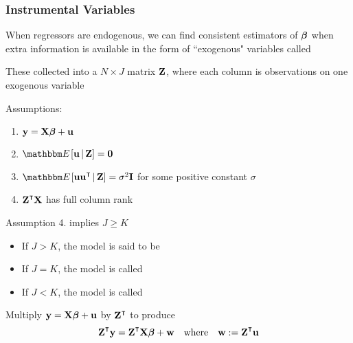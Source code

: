\begin{frame}\frametitle{Instrumental Variables}

    \vspace{2em}
    When regressors are endogenous, we can find consistent estimators of ${\boldsymbol \beta}$ when extra information is
    available in the form of ``exogenous" variables called 
    
    These collected into a $N \times J$ matrix $\mathbf Z$, where
    each column is observations on one exogenous variable 
    
    \vspace{.7em}
    Assumptions:
    \begin{enumerate}
        \item ${\mathbf y} = \mathbf X {\boldsymbol \beta} + {\mathbf u}$
        \item $\EE[ \boldu \given \boldZ] = \boldzero$
        \item $\EE[ \boldu \boldu^\T \given \boldZ] = \sigma^2 \boldI$ for some
            positive constant $\sigma$
        \item $\boldZ^\T \boldX$ has full column rank
    \end{enumerate}


\end{frame}

\begin{frame}
    
    \vspace{2em}
    Assumption 4. implies $J \geq K$
    \begin{itemize}
        \item If $J > K$, the model is said to be 
        \item If $J=K$, the model
    is called 
        \item If $J < K$, the model is called
    \end{itemize}
    
    \vspace{.7em}
    Multiply ${\mathbf y} = \mathbf X {\boldsymbol \beta} + {\mathbf u}$ 
    by $\boldZ^\T$ to produce
    \begin{equation}
        \label{eq:olami}
            \boldZ^\T \boldy = \boldZ^\T \boldX \boldbeta + \boldw
            \quad \text{where} \quad
            \boldw := \boldZ^\T \boldu
    \end{equation}

\end{frame}

